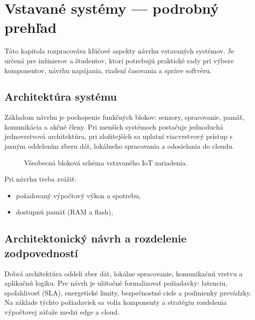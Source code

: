 \section{Vstavané systémy — podrobný prehľad}
\label{sec:embedded-detailed}

Táto kapitola rozpracováva kľúčové aspekty návrhu vstavaných systémov. Je určená pre inžinierov a študentov, ktorí potrebujú praktické rady pri výbere komponentov, návrhu napájania, riadení časovania a správe softvéru.

\subsection{Architektúra systému}
Základom návrhu je pochopenie funkčných blokov: senzory, spracovanie, pamäť, komunikácia a akčné členy. Pri menších systémoch postačuje jednoduchá jednovrstvová architektúra, pri zložitejších sa uplatní viacvrstvový prístup s jasným oddelením zberu dát, lokálneho spracovania a odosielania do cloudu.

\begin{figure}[h]
\centering
{}
\caption{Všeobecná bloková schéma vstavaného IoT zariadenia.}
\end{figure}

Pri návrhu treba zvážiť:
\begin{itemize}
\item požadovaný výpočtový výkon a spotrebu,
\item dostupnú pamäť (RAM a flash),
\end{itemize}

\subsection{Architektonický návrh a rozdelenie zodpovedností}
Dobrá architektúra oddelí zber dát, lokálne spracovanie, komunikačnú vrstvu a aplikačnú logiku. Pre návrh je užitočné formalizovať požiadavky: latenciu, spoľahlivosť (SLA), energetické limity, bezpečnostné ciele a podmienky prevádzky. Na základe týchto požiadaviek sa volia komponenty a stratégiu rozdelenia výpočtovej záťaže medzi edge a cloud.

